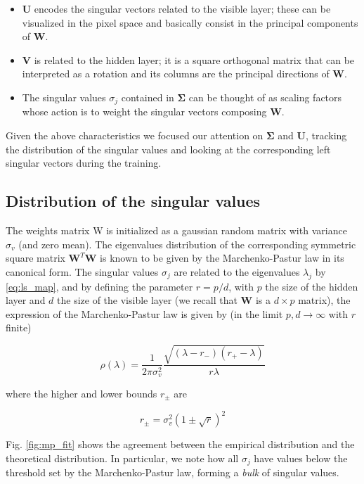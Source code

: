 \documentclass{revtex4-1}
\begin{document}
\begin{itemize}
\item \(\mathbf{U}\) encodes the singular vectors related to the visible layer; these can be visualized in the pixel space and basically consist in the principal components of \(\mathbf{W}\).
\item  \(\mathbf{V}\) is related to the hidden layer; it is a square orthogonal matrix that can be interpreted as a rotation and its columns are the principal directions of \(\mathbf{W}\).
\item The singular values \( {\sigma}_j \) contained in \(\mathbf{\Sigma}\) can be thought of as scaling factors whose action is to weight the singular vectors composing \(\mathbf{W}\).
\end{itemize}

Given the above characteristics we focused our attention on \(\mathbf{\Sigma}\) and \(\mathbf{U}\), tracking the distribution of the singular values and looking at the corresponding left singular vectors during the training.

\subsection{Distribution of the singular values}
The weights matrix W is initialized as a gaussian random matrix with variance \(\sigma_v\) (and zero mean). The eigenvalues distribution of the corresponding symmetric square matrix \(\mathbf{W}^T \mathbf{W} \) is known to be given by the Marchenko-Pastur law \cite{MP_law} in its canonical form. The singular values \(\sigma_j\) are related to the eigenvalues \(\lambda_j\) by \eqref{eq:ls_map}, and by defining the parameter \( r = p/d \), with \(p\) the size of the hidden layer and \(d\) the size of the visible layer (we recall that \(\mathbf{W}\) is a \(d \times p\) matrix), the expression of the Marchenko-Pastur law is given by (in the limit \( p,d \to \infty \) with \(r\) finite)

\begin{equation}
\rho (\lambda) = \frac{1}{2 \pi \sigma_v^2} \frac{\sqrt{(\lambda - r_-)(r_+ - \lambda)}}{r \lambda}
\end{equation}

where the higher and lower bounds \(r_{\pm}\) are

\begin{equation}
r_{\pm} = \sigma_v^2 \left(1 \pm \sqrt{r} \right)^2
\end{equation}

Fig. \ref{fig:mp_fit} shows the agreement between the empirical distribution and the theoretical distribution. In particular, we note how all \(\sigma_j\) have values below the threshold set by the Marchenko-Pastur law, forming a \textit{bulk} of singular values.
\end{document}
